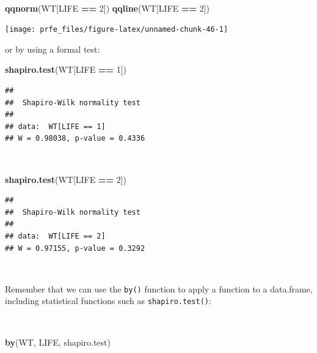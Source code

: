 \documentclass[12pt,a4paper]{book}
\newenvironment{Shaded}{\begin{snugshade}}{\end{snugshade}}
\newcommand{\DecValTok}[1]{\textcolor[rgb]{0.00,0.00,0.81}{#1}}
\newcommand{\KeywordTok}[1]{\textcolor[rgb]{0.13,0.29,0.53}{\textbf{#1}}}
\newcommand{\NormalTok}[1]{#1}
\newcommand{\OperatorTok}[1]{\textcolor[rgb]{0.81,0.36,0.00}{\textbf{#1}}}
\newcommand{\StringTok}[1]{\textcolor[rgb]{0.31,0.60,0.02}{#1}}
\theoremstyle{definition}
\theoremstyle{definition}
\theoremstyle{definition}
\theoremstyle{remark}
\begin{document}
~

\begin{Shaded}
\begin{Highlighting}[]
\KeywordTok{qqnorm}\NormalTok{(WT[LIFE }\OperatorTok{==}\StringTok{ }\DecValTok{2}\NormalTok{])}
\KeywordTok{qqline}\NormalTok{(WT[LIFE }\OperatorTok{==}\StringTok{ }\DecValTok{2}\NormalTok{])}
\end{Highlighting}
\end{Shaded}

\begin{center}\texttt{[image: prfe\_files/figure-latex/unnamed-chunk-46-1]} \end{center}

\newpage

or by using a formal test:

\begin{Shaded}
\begin{Highlighting}[]
\KeywordTok{shapiro.test}\NormalTok{(WT[LIFE }\OperatorTok{==}\StringTok{ }\DecValTok{1}\NormalTok{])}
\end{Highlighting}
\end{Shaded}

\begin{verbatim}
## 
##  Shapiro-Wilk normality test
## 
## data:  WT[LIFE == 1]
## W = 0.98038, p-value = 0.4336
\end{verbatim}

~

\begin{Shaded}
\begin{Highlighting}[]
\KeywordTok{shapiro.test}\NormalTok{(WT[LIFE }\OperatorTok{==}\StringTok{ }\DecValTok{2}\NormalTok{])}
\end{Highlighting}
\end{Shaded}

\begin{verbatim}
## 
##  Shapiro-Wilk normality test
## 
## data:  WT[LIFE == 2]
## W = 0.97155, p-value = 0.3292
\end{verbatim}

~

Remember that we can use the \texttt{by()} function to apply a function
to a data.frame, including statistical functions such as
\texttt{shapiro.test()}:

~

\begin{Shaded}
\begin{Highlighting}[]
\KeywordTok{by}\NormalTok{(WT, LIFE, shapiro.test)}
\end{Highlighting}
\end{Shaded}
\end{document}
